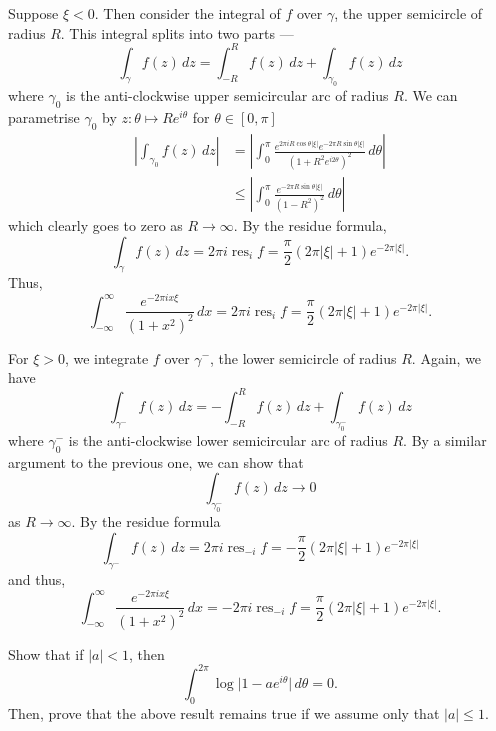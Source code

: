 \documentclass[12 pt, letterpaper]{hmcpset}
\begin{document}
\begin{solution}
	Suppose $\xi < 0$. Then consider the integral of $f$ over $\gamma$, the upper semicircle of radius $R$. This integral splits into two parts ---
	\[
		\int_{\gamma} f(z) \, dz = \int_{-R}^{R} f(z) \, dz + \int_{\gamma_{0}} f(z) \, dz  
	\]
	where $\gamma_{0}$ is the anti-clockwise upper semicircular arc of radius $R$. We can parametrise $\gamma_{0}$ by $z : \theta \mapsto R e^{i \theta}$ for $\theta \in [0, \pi]$
	\[
		\begin{split}
			\left \lvert \int_{\gamma_{0}} f(z) \, dz \right \rvert & = \left \lvert \int_{0}^{\pi} \frac{e^{2 \pi i R \cos{\theta} \lvert \xi \rvert} e^{- 2 \pi R \sin{\theta} \lvert \xi \rvert}}{(1 + R^{2} e^{i 2 \theta})^{2}} \, d\theta  \right \rvert \\
										& \le \left \lvert \int_{0}^{\pi} \frac{e^{- 2 \pi R \sin{\theta} \lvert \xi \rvert}}{(1 - R^{2})^{2}} \, d\theta  \right \rvert
		\end{split}
	\]
	which clearly goes to zero as $R \to \infty$. By the residue formula,
	\[
		\int_{\gamma} f(z) \, dz = 2 \pi i \operatorname{res}_{i} f = \frac{\pi}{2} (2 \pi \lvert \xi \rvert + 1) e^{-2 \pi \lvert \xi \rvert}.
	\]
	Thus,
	\[
		\int_{-\infty}^{\infty} \frac{e^{-2 \pi i x \xi}}{(1 + x^{2})^{2}} \, dx = 2 \pi i \operatorname{res}_{i} f = \frac{\pi}{2}(2 \pi \lvert \xi \rvert + 1) e^{- 2 \pi \lvert \xi \rvert}.
	\]

	For $\xi > 0$, we integrate $f$ over $\gamma^{-}$, the lower semicircle of radius $R$. Again, we have
	\[
		\int_{\gamma^{-}} f(z) \, dz = - \int_{-R}^{R} f(z) \, dz + \int_{\gamma^{-}_{0}} f(z) \, dz
	\]
	where $\gamma^{-}_{0}$ is the anti-clockwise lower semicircular arc of radius $R$. By a similar argument to the previous one, we can show that
	\[
		\int_{\gamma^{-}_{0}} f(z) \, dz \to 0
	\]
	as $R \to \infty$. By the residue formula
	\[
		\int_{\gamma^{-}} f(z) \, dz = 2 \pi i \operatorname{res}_{-i} f = - \frac{\pi}{2}(2 \pi \lvert \xi \rvert + 1) e^{-2 \pi \lvert \xi \rvert}
	\]
	and thus,
	\[
		\int_{-\infty}^{\infty} \frac{e^{- 2 \pi i x \xi}}{(1 + x^{2})^{2}} \, dx = - 2 \pi i \operatorname{res}_{-i} f = \frac{\pi}{2}(2 \pi \lvert \xi \rvert + 1) e^{-2 \pi \lvert \xi \rvert}.
	\]
\end{solution}

\pagebreak

\begin{problem}[11.]
	Show that if $\lvert a \rvert < 1$, then
	\[
		\int_{0}^{2 \pi} \log \lvert 1 - a e^{i \theta} \rvert \, d\theta = 0.
	\]
	Then, prove that the above result remains true if we assume only that $\lvert a \rvert \le 1$.
\end{problem}
\end{document}
